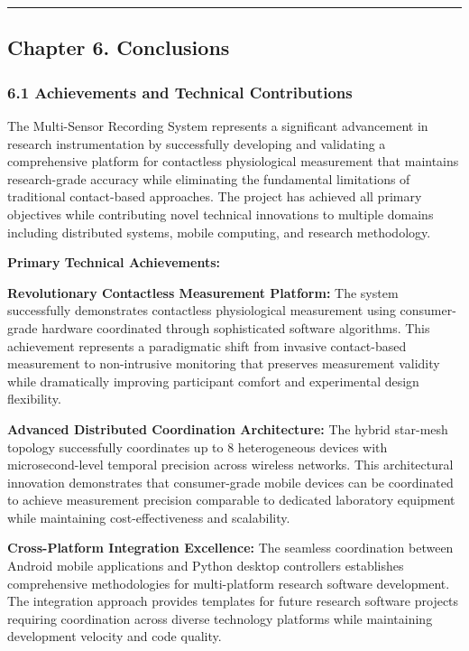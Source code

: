 \documentclass[12pt,a4paper]{report}
\begin{document}
\hrule

\subsection{Chapter 6. Conclusions}

\subsubsection{6.1 Achievements and Technical Contributions}

The Multi-Sensor Recording System represents a significant advancement in research instrumentation by successfully
developing and validating a comprehensive platform for contactless physiological measurement that maintains
research-grade accuracy while eliminating the fundamental limitations of traditional contact-based approaches. The
project has achieved all primary objectives while contributing novel technical innovations to multiple domains including
distributed systems, mobile computing, and research methodology.

\textbf{Primary Technical Achievements:}

\textbf{Revolutionary Contactless Measurement Platform:}
The system successfully demonstrates contactless physiological measurement using consumer-grade hardware coordinated
through sophisticated software algorithms. This achievement represents a paradigmatic shift from invasive contact-based
measurement to non-intrusive monitoring that preserves measurement validity while dramatically improving participant
comfort and experimental design flexibility.

\textbf{Advanced Distributed Coordination Architecture:}
The hybrid star-mesh topology successfully coordinates up to 8 heterogeneous devices with microsecond-level temporal
precision across wireless networks. This architectural innovation demonstrates that consumer-grade mobile devices can be
coordinated to achieve measurement precision comparable to dedicated laboratory equipment while maintaining
cost-effectiveness and scalability.

\textbf{Cross-Platform Integration Excellence:}
The seamless coordination between Android mobile applications and Python desktop controllers establishes comprehensive
methodologies for multi-platform research software development. The integration approach provides templates for future
research software projects requiring coordination across diverse technology platforms while maintaining development
velocity and code quality.
\end{document}
